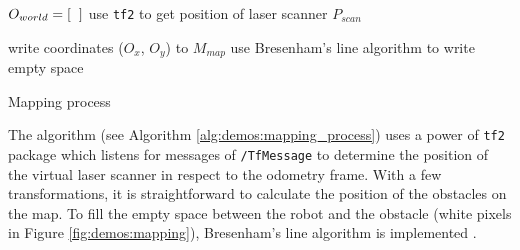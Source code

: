 \vspace*{.4cm}
\begin{algorithm}[H]

$ O_{world} = [\hspace{2mm}] $ 
use \texttt{tf2} to get position of laser scanner $ P_{scan} $\;


write coordinates ($O_{x}$, $O_{y}$) to $ M_{map} $\;
use Bresenham's line algorithm to write empty space\;

\caption{Mapping process}
\label{alg:demos:mapping_process}
\end{algorithm}
\vspace*{.4cm}

The algorithm (see Algorithm \ref{alg:demos:mapping_process}) uses a power of \texttt{tf2} package which listens for messages of \texttt{/TfMessage} to determine the position of the virtual laser scanner in respect to the odometry frame.
With a few transformations, it is straightforward to calculate the position of the obstacles on the map.
To fill the empty space between the robot and the obstacle (white pixels in Figure \ref{fig:demos:mapping}), Bresenham's line algorithm is implemented \cite{borenstein_measurement_1996}.

